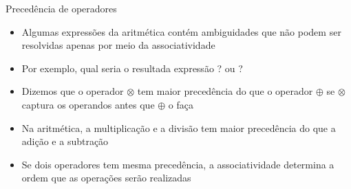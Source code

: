 \begin{frame}[fragile]{Precedência de operadores}

    \begin{itemize}
        \item Algumas expressões da aritmética contém ambiguidades que não podem ser resolvidas apenas por meio da associatividade

        \item Por exemplo, qual seria o resultada expressão ?  ou ?

        \item Dizemos que o operador $\otimes$ tem maior precedência do que o operador $\oplus$ se $\otimes$ captura os operandos antes que $\oplus$ o faça

        \item Na aritmética, a multiplicação e a divisão tem maior precedência do que a adição e a subtração

        \item Se dois operadores tem mesma precedência, a associatividade determina a ordem que as operações serão realizadas
    \end{itemize}

\end{frame}

